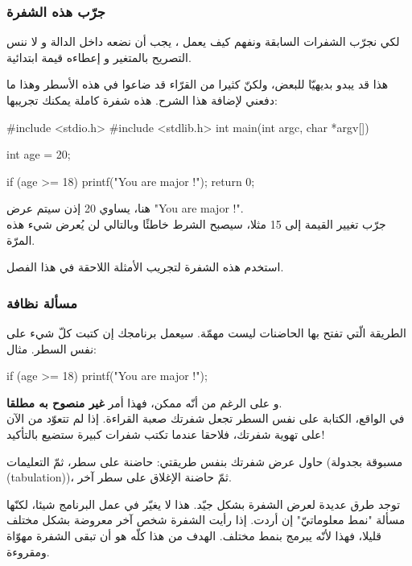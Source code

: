 \subsubsection{جرّب هذه الشفرة}
لكي نجرّب الشفرات السابقة ونفهم كيف يعمل ، يجب أن نضعه داخل الدالة
و لا ننس التصريح بالمتغير 
و إعطاءه قيمة ابتدائية.

هذا قد يبدو بديهيّا للبعض، ولكنّ كثيرا من القرّاء قد ضاعوا في هذه الأسطر وهذا ما دفعني لإضافة هذا الشرح. هذه شفرة كاملة يمكنك تجريبها:

\begin{Csource}
#include <stdio.h>
#include <stdlib.h>
int main(int argc, char *argv[])
{
	int age = 20;
	
	if (age >= 18)
	{
		printf("You are major !\n");
	}
	return 0;
}
\end{Csource}

هنا،
يساوي 20 إذن سيتم عرض
"\textenglish{You are major !}".\\
جرّب تغيير القيمة إلى 15 مثلا، سيصبح الشرط خاطئًا وبالتالي لن يُعرض شيء هذه المرّة.

استخدم هذه الشفرة لتجريب الأمثلة اللاحقة في هذا الفصل.

\subsubsection{مسألة نظافة}

الطريقة الّتي تفتح بها الحاضنات ليست مهمّة. سيعمل برنامجك إن كتبت كلّ شيء على نفس السطر. مثال:

\begin{Csource}
if (age >= 18) { printf("You are major !"); }
\end{Csource}

و على الرغم من أنّه ممكن، فهذا أمر
\textbf{غير منصوح به مطلقا}.\\
في الواقع، الكتابة على نفس السطر تجعل شفرتك صعبة القراءة. إذا لم تتعوّد من الآن على تهوية شفرتك، فلاحقا عندما تكتب شفرات كبيرة ستضيع بالتأكيد!

حاول عرض شفرتك بنفس طريقتي: حاضنة على سطر، ثمّ التعليمات (مسبوقة بجدولة 
(\textenglish{tabulation}))،
 ثمّ حاضنة الإغلاق على سطر آخر.

\begin{information}
توجد طرق عديدة لعرض الشفرة بشكل جيّد. هذا لا يغيّر في عمل البرنامج شيئا، لكنّها مسألة "نمط معلوماتيّ" إن أردت. إذا رأيت الشفرة شخص آخر معروضة بشكل مختلف قليلا، فهذا لأنّه يبرمج بنمط مختلف. الهدف من هذا كلّه هو أن تبقى الشفرة مهوّاة ومقروءة.
\end{information}

